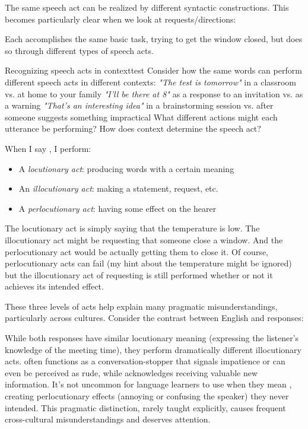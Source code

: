 The same speech act can be realized by different syntactic constructions. This becomes particularly clear when we look at requests/directions:

\ea
   \z
\z
Each accomplishes the same basic task, trying to get the window closed, but does so through different types of speech acts.

\begin{tblsframedsymbol}{Recognizing speech acts in context}{test}
Consider how the same words can perform different speech acts in different contexts:
\ea
    \ea \emph{"The test is tomorrow"} in a classroom vs. at home to your family
    \ex \emph{"I'll be there at 8"} as a response to an invitation vs. as a warning
    \ex \emph{"That's an interesting idea"} in a brainstorming session vs. after someone suggests something impractical
    \z
\z
What different actions might each utterance be performing? How does context determine the speech act?
\end{tblsframedsymbol}
When I say , I perform:
\begin{itemize}[noitemsep]
   \item A \emph{locutionary act}: producing words with a certain meaning 
   \item An \emph{illocutionary act}: making a statement, request, etc. 
   \item A \emph{perlocutionary act}: having some effect on the hearer 
\end{itemize}

The locutionary act is simply saying that the temperature is low. The illocutionary act might be requesting that someone close a window. And the perlocutionary act would be actually getting them to close it. Of course, perlocutionary acts can fail (my hint about the temperature might be ignored) but the illocutionary act of requesting is still performed whether or not it achieves its intended effect.

These three levels of acts help explain many pragmatic misunderstandings, particularly across cultures. Consider the contrast between English  and  responses:

\z
\z
While both responses have similar locutionary meaning (expressing the listener's knowledge of the meeting time), they perform dramatically different illocutionary acts.  often functions as a conversation-stopper that signals impatience or can even be perceived as rude, while  acknowledges receiving valuable new information. It's not uncommon for language learners to use  when they mean , creating perlocutionary effects (annoying or confusing the speaker) they never intended. This pragmatic distinction, rarely taught explicitly, causes frequent cross-cultural misunderstandings and deserves attention.

